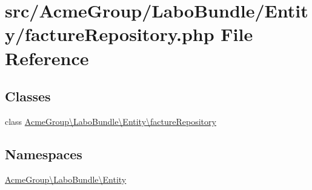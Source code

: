 \hypertarget{facture_repository_8php}{\section{src/\+Acme\+Group/\+Labo\+Bundle/\+Entity/facture\+Repository.php File Reference}
\label{facture_repository_8php}
}
\subsection*{Classes}
\begin{DoxyCompactItemize}
\item 
class \hyperlink{class_acme_group_1_1_labo_bundle_1_1_entity_1_1facture_repository}{Acme\+Group\textbackslash{}\+Labo\+Bundle\textbackslash{}\+Entity\textbackslash{}facture\+Repository}
\end{DoxyCompactItemize}
\subsection*{Namespaces}
\begin{DoxyCompactItemize}
\item 
 \hyperlink{namespace_acme_group_1_1_labo_bundle_1_1_entity}{Acme\+Group\textbackslash{}\+Labo\+Bundle\textbackslash{}\+Entity}
\end{DoxyCompactItemize}
